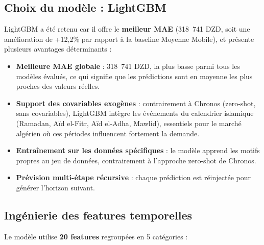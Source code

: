 \documentclass[12pt,a4paper]{report}
\begin{document}
\subsection{Choix du mod\`{e}le : LightGBM}

LightGBM a \'{e}t\'{e} retenu car il offre le \textbf{meilleur MAE} (318~741 DZD, soit une am\'{e}lioration de +12,2\% par rapport \`{a} la baseline Moyenne Mobile), et pr\'{e}sente plusieurs avantages d\'{e}terminants :

\begin{itemize}
  \item \textbf{Meilleure MAE globale} : 318~741 DZD, la plus basse parmi tous les mod\`{e}les \'{e}valu\'{e}s, ce qui signifie que les pr\'{e}dictions sont en moyenne les plus proches des valeurs r\'{e}elles.
  \item \textbf{Support des covariables exog\`{e}nes} : contrairement \`{a} Chronos (zero-shot, sans covariables), LightGBM int\`{e}gre les \'{e}v\'{e}nements du calendrier islamique (Ramadan, A\"{i}d el-Fitr, A\"{i}d el-Adha, Mawlid), essentiels pour le march\'{e} alg\'{e}rien o\`{u} ces p\'{e}riodes influencent fortement la demande.
  \item \textbf{Entra\^{i}nement sur les donn\'{e}es sp\'{e}cifiques} : le mod\`{e}le apprend les motifs propres au jeu de donn\'{e}es, contrairement \`{a} l'approche zero-shot de Chronos.
  \item \textbf{Pr\'{e}vision multi-\'{e}tape r\'{e}cursive} : chaque pr\'{e}diction est r\'{e}inject\'{e}e pour g\'{e}n\'{e}rer l'horizon suivant.
\end{itemize}

\subsection{Ing\'{e}nierie des features temporelles}

Le mod\`{e}le utilise \textbf{20 features} regroup\'{e}es en 5 cat\'{e}gories :
\end{document}
